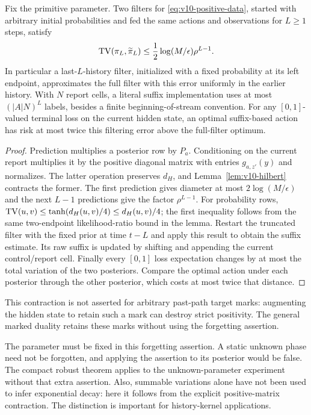 \begin{theorem}\label{thm:v10-forgetting}
Fix the primitive parameter. Two filters for
\eqref{eq:v10-positive-data}, started with arbitrary initial
probabilities and fed the same actions and observations for $L\ge1$
steps, satisfy
\[
 \mathrm{TV}(\pi_L,\widetilde\pi_L)
 \le \frac12\log(M/\epsilon)\rho^{L-1}.
\]
In particular a last-$L$-history filter, initialized with a fixed
probability at its left endpoint, approximates the full filter with
this error uniformly in the earlier history. With $N$ report cells,
a literal suffix implementation uses at most $(|A|N)^L$ labels,
besides a finite beginning-of-stream convention. For any $[0,1]$-valued terminal loss on the current hidden state,
an optimal suffix-based action has risk at
most twice this filtering error above the full-filter optimum.
\end{theorem}
\begin{proof}
Prediction multiplies a posterior row by $P_a$. Conditioning on the
current report multiplies it by the positive diagonal matrix with
entries $g_{a,z'}(y)$ and normalizes. The latter operation preserves
$d_H$, and Lemma~\ref{lem:v10-hilbert} contracts the former. The first
prediction gives diameter at most $2\log(M/\epsilon)$ and the next
$L-1$ predictions give the factor $\rho^{L-1}$. For probability rows,
$\mathrm{TV}(u,v)\le\tanh(d_H(u,v)/4)\le d_H(u,v)/4$; the first inequality
follows from the same two-endpoint likelihood-ratio bound in the
lemma. Restart the truncated filter with the fixed prior at time
$t-L$ and apply this result to obtain the suffix estimate.
Its raw suffix is updated by shifting and appending the current
control/report cell. Finally every $[0,1]$ loss expectation changes
by at most the total variation of the two posteriors. Compare the
optimal action under each posterior through the other posterior,
which costs at most twice that distance.
\end{proof}

This contraction is not asserted for arbitrary past-path target marks:
augmenting the hidden state to retain such a mark can destroy strict
positivity. The general marked duality retains these marks without
using the forgetting assertion.

The parameter must be fixed in this forgetting assertion. A static
unknown phase need not be forgotten, and applying the assertion to
its posterior would be false. The compact robust theorem applies to
the unknown-parameter experiment without that extra assertion. Also,
summable variations alone have not been used to infer exponential
decay: here it follows from the explicit positive-matrix contraction.
The distinction is important for history-kernel applications.

